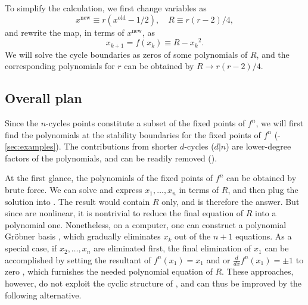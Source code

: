 \documentclass{ws-ijbc}
\begin{document}
To simplify the calculation, we first change variables \cite{mandelbrot, brown1, brown2, saha} as
%
\[
    x^{\mathrm{new}} \equiv r(x^{\mathrm{old}} - 1/2),
    \quad R \equiv r(r-2)/4,
\]
%
and rewrite the map, in terms of $x^{\mathrm{new}}$, as
%
\begin{equation}
  x_{k+1} = f(x_k) \equiv R - {x_k}^2.
\label{eq:logmaps}
\end{equation}
%
%
We will solve the cycle boundaries as zeros of some polynomials of $R$,
and the corresponding polynomials for $r$ can be obtained by $R \rightarrow r(r-2)/4$.
%
%






\subsection{Overall plan}

Since the $n$-cycles points constitute a subset of the fixed points of $f^n$,
we will first find
  the polynomials at the stability boundaries
  for the fixed points of $f^n$
  (-\ref{sec:examples}).
The contributions from shorter $d$-cycles ($d|n$)
  are lower-degree factors of the polynomials,
  and can be readily removed ().


At the first glance, the polynomials of the fixed points of $f^n$
  can be obtained by brute force.
We can solve
   and express $x_1, \ldots, x_n$
  in terms of $R$,
  and then plug the solution into .
The result would contain $R$ only,
  and is therefore the answer.
But since  are nonlinear,
  it is nontrivial to reduce the final equation of $R$
  into a polynomial one.
Nonetheless, on a computer, one can
  construct a polynomial Gr\"obner basis \cite{kk1},
  which gradually eliminates $x_k$ out of the $n+1$ equations.
As a special case, if $x_2, \dots, x_n$ are eliminated first,
  the final elimination of $x_1$ can be accomplished
  by setting the resultant of $f^n(x_1) = x_1$ and
   or $\frac{d}{dx}f^n (x_1) = \pm 1$
  to zero \cite{burm},
  which furnishes the needed polynomial equation of $R$.
%
These approaches, however, do not
  exploit the cyclic structure of ,
  and can thus be improved by the following alternative.
\end{document}
